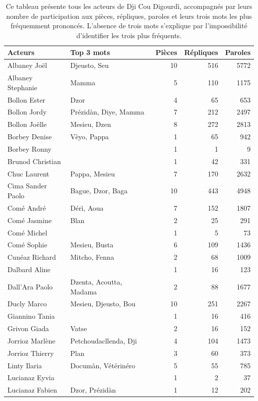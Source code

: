 \begin{longtable}{llrrr}
\caption{\small Ce tableau présente tous les acteurs de Dji Cou Digourdì, accompagnés par leurs nombre de participation aux pièces, répliques, paroles et leurs trois mots les plus fréquemment prononcés. L'absence de trois mots s'explique par l'impossibilité d'identifier les trois plus fréquents.}\\
\toprule
\textbf{Acteurs} & \textbf{Top 3 mots} & \textbf{Pièces} & \textbf{Répliques} & \textbf{Paroles} \\
    \midrule
Albaney Joël &Djeusto, Seu & 10 & 516 & 5772\\
Albaney Stephanie &Mamma & 5 & 110 & 1175\\
Bollon Ester &Dzor & 4 & 65 & 653\\
Bollon Jordy &Prézidàn, Diye, Mamma & 7 & 212 & 2497\\
Bollon Joëlle &Mesieu, Dzen & 8 & 272 & 2813\\
Borbey Denise &Vèyo, Pappa & 1 & 65 & 942\\
Borbey Ronny & & 1 & 1 & 9\\
Brunod Christian & & 1 & 42 & 331\\
Chuc Laurent &Pappa, Mesieu & 7 & 170 & 2632\\
Cima Sander Paolo &Bague, Dzor, Baga & 10 & 443 & 4948\\
Comé André &Dérì, Aoua & 7 & 152 & 1807\\
Comé Jasmine &Blan & 2 & 25 & 291\\
Comé Michel & & 1 & 5 & 73\\
Comé Sophie &Mesieu, Busta & 6 & 109 & 1436\\
Cunéaz Richard &Mitcho, Fenna & 2 & 68 & 1009\\
Dalbard Aline & & 1 & 16 & 123\\
Dall'Ara Paolo &Dzenta, Acoutta, Madama & 2 & 88 & 1677\\
Ducly Marco &Mesieu, Djeusto, Bou & 10 & 251 & 2267\\
Giannino Tania & & 1 & 16 & 416\\
Grivon Giada &Vatse & 2 & 16 & 152\\
Jorrioz Marlène &Petchoudacllenda, Dji & 4 & 104 & 1473\\
Jorrioz Thierry &Plan & 3 & 60 & 373\\
Linty Ilaria &Documàn, Vétérinéro & 5 & 55 & 785\\
Lucianaz Eyvia & & 1 & 2 & 37\\
Lucianaz Fabien &Dzor, Prézidàn & 1 & 12 & 202\\

\end{longtable}
